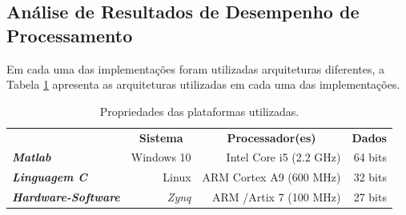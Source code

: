  
\subsection{Análise de Resultados de Desempenho de Processamento}

Em cada uma das implementações foram utilizadas arquiteturas diferentes, a Tabela \ref{propriedades} apresenta as arquiteturas utilizadas em cada uma das implementações.  

\begin{table}[!h]
	\label{propriedades}
	\caption{Propriedades das plataformas utilizadas.}
	\centering
	\begin{tabular}{lrrr}
		\rowcolor[HTML]{DAE8FC} 
		\multicolumn{1}{c}{\cellcolor[HTML]{DAE8FC}\textbf{Implementação}} & \multicolumn{1}{c}{\cellcolor[HTML]{DAE8FC}\textbf{Sistema}} & \multicolumn{1}{c}{\cellcolor[HTML]{DAE8FC}\textbf{Processador(es)}} & \multicolumn{1}{c}{\cellcolor[HTML]{DAE8FC}\textbf{Dados}} \\
		\textit{\textbf{Matlab}}                                        & Windows 10                                                   & Intel Core i5 (2.2 GHz)                                              & 64 bits                                                    \\
		\rowcolor[HTML]{DAE8FC} 
		\textit{\textbf{Linguagem C}}                                   & Linux                                                        & ARM Cortex A9 (600 MHz)                                              & 32 bits                                                    \\
		\textit{\textbf{Hardware-Software}}                             & \textit{Zynq}                                                & ARM /Artix 7 (100 MHz)                                               & 27 bits                                                   
	\end{tabular}
\end{table}


